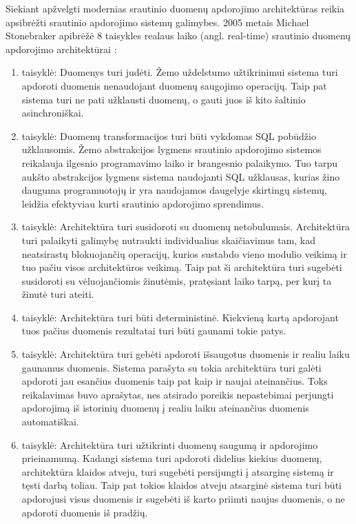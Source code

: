 \documentclass{VUMIFPSbakalaurinis}
\begin{document}
Siekiant apžvelgti modernias srautinio duomenų apdorojimo architektūras reikia apsibrėžti srautinio apdorojimo sistemų galimybes.
2005 metais Michael Stonebraker apibrėžė 8 taisykles realaus laiko (angl. real-time) srautinio duomenų apdorojimo architektūrai \cite{stonebraker20058}:
\begin{enumerate}[label=\arabic*]
    \item taisyklė: Duomenys turi judėti. Žemo uždelstumo užtikrinimui sistema turi apdoroti duomenis nenaudojant duomenų saugojimo operacijų. 
    Taip pat sistema turi ne pati užklausti duomenų, o gauti juos iš kito šaltinio asinchroniškai. 
    \item taisyklė: Duomenų transformacijos turi būti vykdomas SQL pobūdžio užklausomis. Žemo abstrakcijos lygmens srautinio apdorojimo sistemos reikalauja ilgesnio 
    programavimo laiko ir brangesnio palaikymo. Tuo tarpu aukšto abstrakcijos lygmens sistema 
    naudojanti SQL užklausas, kurias žino dauguma programuotojų ir yra naudojamos daugelyje skirtingų sistemų, leidžia efektyviau kurti srautinio apdorojimo sprendimus.
    \item taisyklė: Architektūra turi susidoroti su duomenų netobulumais. Architektūra turi palaikyti galimybę nutraukti individualius skaičiavimus
    tam, kad neatsirastų blokuojančių operacijų, kurios sustabdo vieno modulio veikimą ir tuo pačiu visos architektūros veikimą. Taip pat ši 
    architektūra turi sugebėti susidoroti su vėluojančiomis žinutėmis, pratęsiant laiko tarpą, per kurį ta žinutė turi ateiti.
    \item taisyklė: Architektūra turi būti deterministinė. Kiekvieną kartą apdorojant tuos pačius duomenis rezultatai turi būti gaunami tokie patys.
    \item taisyklė: Architektūra turi gebėti apdoroti išsaugotus duomenis ir realiu laiku gaunamus duomenis. Sistema parašyta su tokia architektūra turi galėti apdoroti jau esančius duomenis taip pat kaip ir 
    naujai ateinančius. Toks reikalavimas buvo aprašytas, nes atsirado poreikis nepastebimai perjungti apdorojimą iš istorinių duomenų į realiu laiku ateinančius duomenis automatiškai.
    \item taisyklė: Architektūra turi užtikrinti duomenų saugumą ir apdorojimo prieinamumą. Kadangi sistema turi apdoroti didelius kiekius duomenų, architektūra klaidos atveju, turi sugebėti persijungti į atsarginę
    sistemą ir tęsti darbą toliau. Taip pat tokios klaidos atveju atsarginė sistema turi būti apdorojusi visus duomenis ir sugebėti iš karto priimti naujus duomenis, o ne apdoroti duomenis iš pradžių.

\end{enumerate}
\end{document}
